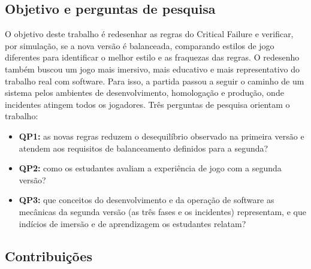 \subsection{Objetivo e perguntas de pesquisa}

O objetivo deste trabalho é redesenhar as regras do Critical Failure e verificar, por simulação, se a nova versão
é balanceada, comparando estilos de jogo diferentes para identificar o melhor estilo e as fraquezas das regras.
O redesenho também buscou um jogo mais imersivo, mais educativo e mais representativo do trabalho real com
software. Para isso, a partida passou a seguir o caminho de um sistema pelos ambientes de desenvolvimento,
homologação e produção, onde incidentes atingem todos os jogadores. Três perguntas de pesquisa orientam o
trabalho:

\begin{itemize}
  \item \textbf{QP1:} as novas regras reduzem o desequilíbrio observado na primeira versão e atendem aos
    requisitos de balanceamento definidos para a segunda?
  \item \textbf{QP2:} como os estudantes avaliam a experiência de jogo com a segunda versão?
  \item \textbf{QP3:} que conceitos do desenvolvimento e da operação de software as mecânicas da segunda
    versão (as três fases e os incidentes) representam, e que indícios de imersão e de aprendizagem os
    estudantes relatam?
\end{itemize}

\subsection{Contribuições}

